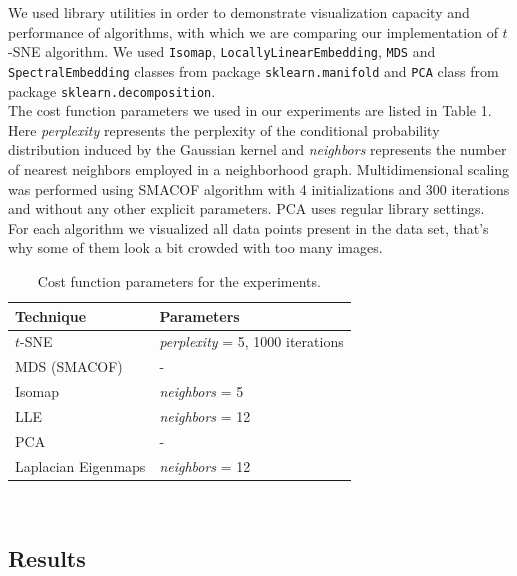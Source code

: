 We used library utilities in order to demonstrate visualization capacity and performance of algorithms, with which we are comparing our implementation of $t$-SNE algorithm. We used \texttt{Isomap}, \texttt{LocallyLinearEmbedding}, \texttt{MDS} and \texttt{SpectralEmbedding} classes from package \texttt{sklearn.manifold} and \texttt{PCA} class from package \texttt{sklearn.decomposition}.\\

The cost function parameters we used in our experiments are listed in Table 1. Here \textit{perplexity} represents the perplexity of the conditional probability distribution induced by the Gaussian kernel and \textit{neighbors} represents the number of nearest neighbors employed in a neighborhood graph. Multidimensional scaling was performed using SMACOF algorithm with 4 initializations and 300 iterations and without any other explicit parameters. PCA uses regular library settings.\\

For each algorithm we visualized all data points present in the data set, that's why some of them look a bit crowded with too many images. 

\begin{table}[H]
	\centering
	\begin{tabular}{| l | l |}
		\hline
		Technique & Parameters \\
		\hline			
		$t$-SNE & \textit{perplexity} = 5, 1000 iterations    \\
		MDS (SMACOF) & -  \\
		Isomap & \textit{neighbors} = 5  \\
		LLE & \textit{neighbors} = 12 \\
		PCA & - \\
		Laplacian Eigenmaps & \textit{neighbors} = 12 \\
		\hline  
	\end{tabular}\\
	\caption{Cost function parameters for the experiments.}
\end{table}

\subsection{Results}



